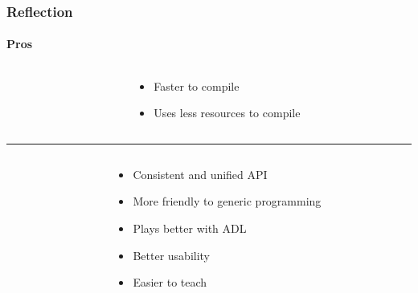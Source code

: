 \documentclass[compress,table,xcolor=table]{beamer}
\begin{document}
\begin{frame}
  \frametitle{Reflection}
  \framesubtitle{Pros}
  \begin{columns}
    \begin{column}{.05\textwidth}
    \end{column}
    \begin{column}{.85\textwidth}
    \large
    \begin{itemize}
      \item Faster to compile
      \item Uses less resources to compile
    \end{itemize}
    \end{column}
  \end{columns}
  \vfill
  \hrule
  \vfill
  \begin{columns}
    \begin{column}{.05\textwidth}
    \end{column}
    \begin{column}{.85\textwidth}
    \large
    \begin{itemize}
      \item Consistent and unified API
      \item More friendly to generic programming
      \item Plays better with ADL
      \item Better usability
      \item Easier to teach
    \end{itemize}
    \end{column}
  \end{columns}
\end{frame}
\end{document}

